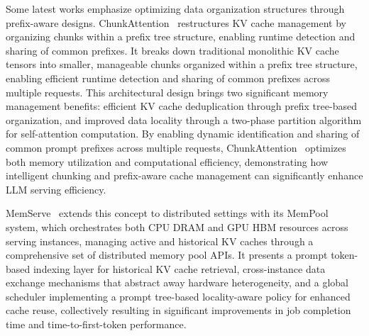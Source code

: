 Some latest works emphasize optimizing data organization structures through prefix-aware designs. ChunkAttention~\cite{ye2024chunkattentionefficientselfattentionprefixaware} restructures KV cache management by organizing chunks within a prefix tree structure, enabling runtime detection and sharing of common prefixes. It breaks down traditional monolithic KV cache tensors into smaller, manageable chunks organized within a prefix tree structure, enabling efficient runtime detection and sharing of common prefixes across multiple requests. This architectural design brings two significant memory management benefits: efficient KV cache deduplication through prefix tree-based organization, and improved data locality through a two-phase partition algorithm for self-attention computation. By enabling dynamic identification and sharing of common prompt prefixes across multiple requests, ChunkAttention~\cite{ye2024chunkattentionefficientselfattentionprefixaware} optimizes both memory utilization and computational efficiency, demonstrating how intelligent chunking and prefix-aware cache management can significantly enhance LLM serving efficiency.

MemServe~\cite{hu2024memservecontextcachingdisaggregated} extends this concept to distributed settings with its MemPool system, which orchestrates both CPU DRAM and GPU HBM resources across serving instances, managing active and historical KV caches through a comprehensive set of distributed memory pool APIs. It presents a prompt token-based indexing layer for historical KV cache retrieval, cross-instance data exchange mechanisms that abstract away hardware heterogeneity, and a global scheduler implementing a prompt tree-based locality-aware policy for enhanced cache reuse, collectively resulting in significant improvements in job completion time and time-to-first-token performance.



